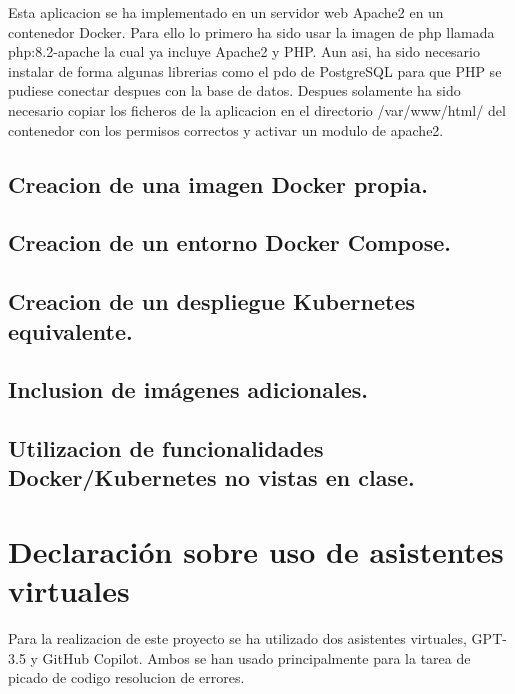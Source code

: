 \documentclass{report}
\begin{document}
            Esta aplicacion se ha implementado en un servidor web Apache2 en un contenedor Docker. Para ello lo primero ha sido usar la imagen de php llamada php:8.2-apache la cual ya incluye Apache2 y PHP. 
            Aun asi, ha sido necesario instalar de forma algunas librerias como el pdo de PostgreSQL para que PHP se pudiese conectar despues con la base de datos. 
            Despues solamente ha sido necesario copiar los ficheros de la aplicacion en el directorio /var/www/html/ del contenedor con los permisos correctos y activar un modulo de apache2.\\
        \clearpage
        \section{Creacion de una imagen Docker propia.} 
        \clearpage
        \section{Creacion de un entorno Docker Compose.}
        \clearpage
        \section{Creacion de un despliegue Kubernetes equivalente.}
        \clearpage
        \section{Inclusion de imágenes adicionales.}
        \clearpage
        \section{Utilizacion de funcionalidades Docker/Kubernetes no vistas en clase.}
    \chapter{Declaración sobre uso de asistentes virtuales}
        Para la realizacion de este proyecto se ha utilizado dos asistentes virtuales, GPT-3.5 y GitHub Copilot.
        Ambos se han usado principalmente para la tarea de picado de codigo resolucion de errores.
\end{document}

